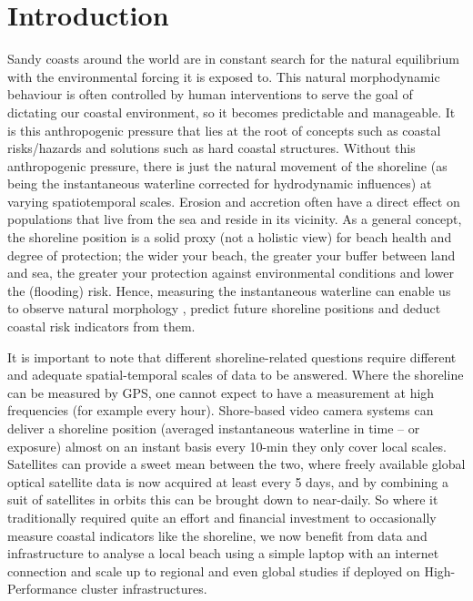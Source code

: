 \documentclass[remotesensing,article,submit,pdftex,moreauthors]{Definitions/mdpi}
\begin{document}
\section{Introduction}
Sandy coasts around the world are in constant search for the natural equilibrium with the environmental forcing it is exposed to. This natural morphodynamic behaviour is often controlled by human interventions to serve the goal of dictating our coastal environment, so it becomes predictable and manageable. It is this anthropogenic pressure that lies at the root of concepts such as coastal risks/hazards and solutions such as hard coastal structures. Without this anthropogenic pressure, there is just the natural movement of the shoreline (as being the instantaneous waterline corrected for hydrodynamic influences) at varying spatiotemporal scales. Erosion and accretion often have a direct effect on populations that live from the sea and reside in its vicinity. As a general concept, the shoreline position is a solid proxy (not a holistic view) for beach health and degree of protection; the wider your beach, the greater your buffer between land and sea, the greater your protection against environmental conditions and lower the (flooding) risk. Hence, measuring the instantaneous waterline can enable us to observe natural morphology \citep{Vitousek:17b}, predict future shoreline positions \citep{vitousek:23} and deduct coastal risk indicators from them.

It is important to note that different shoreline-related questions require different and adequate spatial-temporal scales of data to be answered. Where the shoreline can be measured by GPS, one cannot expect to have a measurement at high frequencies (for example every hour). Shore-based video camera systems can deliver a shoreline position (averaged instantaneous waterline in time -- or exposure) almost on an instant basis every 10-min they only cover local scales. Satellites can provide a sweet mean between the two, where freely available global optical satellite data is now acquired at least every 5 days, and by combining a suit of satellites in orbits this can be brought down to near-daily. So where it traditionally required quite an effort and financial investment to occasionally measure coastal indicators like the shoreline, we now benefit from data and infrastructure to analyse a local beach using a simple laptop with an internet connection and scale up to regional and even global studies if deployed on High-Performance cluster infrastructures. 
\end{document}
